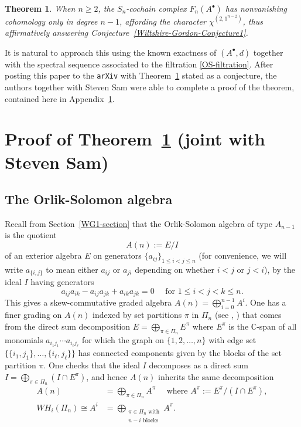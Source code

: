 \documentclass[12pt]{amsart}
\theoremstyle{plain}
\newtheorem{thm}{Theorem}[section]
\theoremstyle{definition}
\begin{document}
\begin{thm}
\label{sharper-WG1-conj}
When $n \ge 2$, the $S_n$-cochain complex $F_n(A^\bullet)$ has
nonvanishing cohomology only in degree $n-1$,
affording the character $\chi^{(2,1^{n-2})}$,
thus affirmatively answering 
Conjecture~\ref{Wiltshire-Gordon-Conjecture1}.
\end{thm}

\noindent
It is natural to approach this using the 
known exactness of $(A^\bullet,d)$ together with 
the spectral sequence associated to the filtration
\eqref{OS-filtration}.
After posting this paper to the {\tt arXiv} with
Theorem~\ref{sharper-WG1-conj} stated as a conjecture,
the authors together with Steven Sam were able to complete a
proof of the theorem, contained here in Appendix~\ref{sharper-conj-section}. 

\appendix
\section{Proof of Theorem~\ref{sharper-WG1-conj} (joint with Steven Sam)} 
\label{sharper-conj-section}

\subsection{The Orlik-Solomon algebra}

Recall from Section~\ref{WG1-section} that the Orlik-Solomon algebra of type $A_{n-1}$ is the quotient
\begin{equation}
\label{OS-algebra-definition}
A(n):=E/I
\end{equation}
of an exterior algebra $E$ on  generators
$\{ a_{ij} \}_{1 \leq i < j \leq n}$ (for convenience, we will write $a_{\{i,j\}}$ to mean either $a_{ij}$ or $a_{ji}$ depending on whether $i<j$ or $j<i$), by the ideal $I$ having generators
\begin{equation*}
a_{ij}a_{ik}-a_{ij}a_{jk}+a_{ik}a_{jk}=0 \quad  \text{ for }1\leq i<j<k \leq n.
\end{equation*}
This gives a skew-commutative graded algebra $A(n)=\bigoplus_{i=0}^{n-1} A^i$.
One has a finer grading on $A(n)$ indexed by set partitions $\pi$ in $\Pi_n$
(see \cite[\S 3.1]{OrlikTerao}, \cite[\S 2.3]{DimcaYuzvinsky})
that comes from the direct sum decomposition 
$
E=\bigoplus_{\pi \in \Pi_n} E^\pi
$
where $E^\pi$ is the ${{\mathbb C}}$-span of all monomials $a_{i_1 j_1} \cdots a_{i_\ell j_\ell}$
for which the graph on $\{1,2,\ldots,n\}$ with edge set $\{ \{i_1,j_1\},\ldots,\{i_\ell,j_\ell\} \}$ has
connected components given by the blocks of the set partition $\pi$. One checks that the
ideal $I$ decomposes as a direct sum $I=\bigoplus_{\pi \in \Pi_n} (I \cap E^\pi)$,
and hence $A(n)$ inherits the same decomposition 
$$
\begin{aligned}
A(n) &= \bigoplus_{\pi \in \Pi_n} A^\pi \quad \text{ where } A^\pi:=E^\pi/(I \cap E^\pi),\\
WH_i(\Pi_n) \cong A^i&=\bigoplus_{\substack{\pi \in \Pi_n \text{ with}\\ n-i \text{ blocks}}}A^\pi.
\end{aligned}
$$
\end{document}
